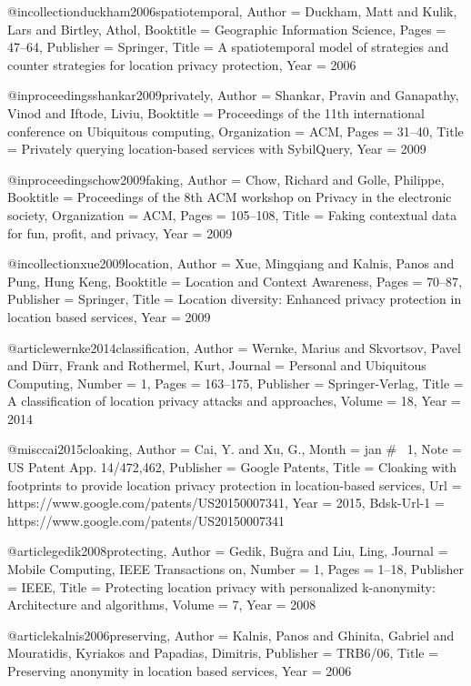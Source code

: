 {{{{{{{{{@incollection{duckham2006spatiotemporal,
	Author = {Duckham, Matt and Kulik, Lars and Birtley, Athol},
	Booktitle = {Geographic Information Science},
	Pages = {47--64},
	Publisher = {Springer},
	Title = {A spatiotemporal model of strategies and counter strategies for location privacy protection},
	Year = {2006}}

@inproceedings{shankar2009privately,
	Author = {Shankar, Pravin and Ganapathy, Vinod and Iftode, Liviu},
	Booktitle = {Proceedings of the 11th international conference on Ubiquitous computing},
	Organization = {ACM},
	Pages = {31--40},
	Title = {Privately querying location-based services with SybilQuery},
	Year = {2009}}

@inproceedings{chow2009faking,
	Author = {Chow, Richard and Golle, Philippe},
	Booktitle = {Proceedings of the 8th ACM workshop on Privacy in the electronic society},
	Organization = {ACM},
	Pages = {105--108},
	Title = {Faking contextual data for fun, profit, and privacy},
	Year = {2009}}

@incollection{xue2009location,
	Author = {Xue, Mingqiang and Kalnis, Panos and Pung, Hung Keng},
	Booktitle = {Location and Context Awareness},
	Pages = {70--87},
	Publisher = {Springer},
	Title = {Location diversity: Enhanced privacy protection in location based services},
	Year = {2009}}

@article{wernke2014classification,
	Author = {Wernke, Marius and Skvortsov, Pavel and D{\"u}rr, Frank and Rothermel, Kurt},
	Journal = {Personal and Ubiquitous Computing},
	Number = {1},
	Pages = {163--175},
	Publisher = {Springer-Verlag},
	Title = {A classification of location privacy attacks and approaches},
	Volume = {18},
	Year = {2014}}

@misc{cai2015cloaking,
	Author = {Cai, Y. and Xu, G.},
	Month = jan # {~1},
	Note = {US Patent App. 14/472,462},
	Publisher = {Google Patents},
	Title = {Cloaking with footprints to provide location privacy protection in location-based services},
	Url = {https://www.google.com/patents/US20150007341},
	Year = {2015},
	Bdsk-Url-1 = {https://www.google.com/patents/US20150007341}}

@article{gedik2008protecting,
	Author = {Gedik, Bu{\u{g}}ra and Liu, Ling},
	Journal = {Mobile Computing, IEEE Transactions on},
	Number = {1},
	Pages = {1--18},
	Publisher = {IEEE},
	Title = {Protecting location privacy with personalized k-anonymity: Architecture and algorithms},
	Volume = {7},
	Year = {2008}}

@article{kalnis2006preserving,
	Author = {Kalnis, Panos and Ghinita, Gabriel and Mouratidis, Kyriakos and Papadias, Dimitris},
	Publisher = {TRB6/06},
	Title = {Preserving anonymity in location based services},
	Year = {2006}}

}}}}}}}}}
